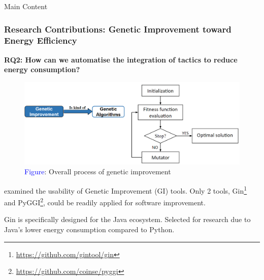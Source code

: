 \documentclass{beamer}
\begin{document}
\begin{frame}{Main Content}
  \frametitle{Research Contributions: Genetic Improvement toward Energy Efficiency}

  \vspace*{-.2cm} %
  
  \textbf{\footnotesize RQ2: How  can we automatise the integration of tactics to reduce energy consumption?}
 \vspace*{-.5cm} %
  \begin{figure}
    \centering
    \includegraphics[width=.7\textwidth]{figures/Slide_14(Genetic Improvement).png}
    \caption*{\scriptsize{\textcolor{blue}{Figure}: Overall process of genetic improvement}}
 \end{figure}
 
 \vspace{-.8em}
\footnotesize{\cite{DBLP:conf/gecco/ZuoBP22} examined the usability of Genetic Improvement (GI) tools. Only 2 tools, Gin\footnote{\tiny \url{https://github.com/gintool/gin}} and PyGGI\footnote{\tiny \url{https://github.com/coinse/pyggi}}, could be readily applied for software improvement.}
\vspace{.5em}

\footnotesize{\footnotesize Gin is specifically designed for the Java ecosystem. Selected for research due to Java's lower energy consumption compared to Python.}
 
 
\end{frame}
\end{document}
